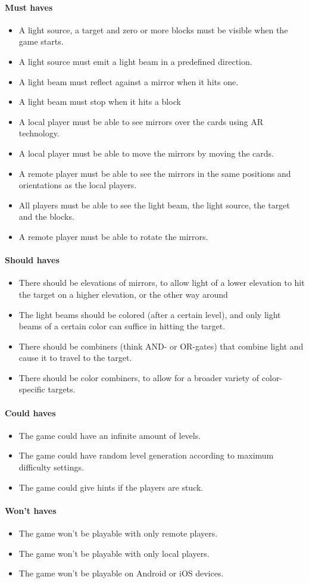 \paragraph{Must haves}
\begin{itemize}
	\item A light source, a target and zero or more blocks must be visible when the game starts.
	\item A light source must emit a light beam in a predefined direction.
	\item A light beam must reflect against a mirror when it hits one.
	\item A light beam must stop when it hits a block
	\item A local player must be able to see mirrors over the cards using AR technology.
	\item A local player must be able to move the mirrors by moving the cards.
	\item A remote player must be able to see the mirrors in the same positions and 
		  orientations as the local players.
	\item All players must be able to see the light beam, the light source, the target and the blocks.
	\item A remote player must be able to rotate the mirrors.
\end{itemize}

\paragraph{Should haves}
\begin{itemize}
	\item There should be elevations of mirrors, to allow light of a lower elevation to hit the target on a higher elevation, or the other way around
	\item The light beams should be colored (after a certain level), and only light beams of a certain color can suffice in hitting the target.
	\item There should be combiners (think AND- or OR-gates) that combine light and cause it to travel to the target.
	\item There should be color combiners, to allow for a broader variety of color-specific targets.
\end{itemize}

\paragraph{Could haves}
\begin{itemize}
	\item The game could have an infinite amount of levels.
	\item The game could have random level generation according to maximum difficulty settings.
	\item The game could give hints if the players are stuck.
\end{itemize}

\paragraph{Won't haves}
\begin{itemize}
	\item The game won't be playable with only remote players.
	\item The game won't be playable with only local players.
	\item The game won't be playable on Android or iOS devices.
\end{itemize}
